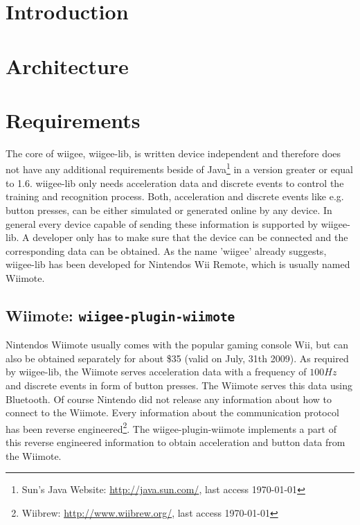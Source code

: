 \documentclass[%
   11pt,              %
   english,           %
   a4paper,           %
   DIV11,             %
   BCOR12mm,		  %
   titlepage,		  %
   bibtotoc,		  %
   liststotoc,		  %
   final,			  %
   twoside,			  %
   openright,		  %
   cleardoubleempty   %
]{scrreprt}%
\begin{document}
\begin{titlepage}
 
\end{titlepage}

\tableofcontents

\chapter{Introduction}

\chapter{Architecture}


\chapter{Requirements}
The core of wiigee, wiigee-lib, is written device independent and therefore does not have any additional requirements beside of Java\footnote{Sun's Java Website: \url{http://java.sun.com/}, last access \today} in a version greater or equal to 1.6. wiigee-lib only needs acceleration data and discrete events to control the training and recognition process. Both, acceleration and discrete events like e.g. button presses, can be either simulated or generated online by any device. In general every device capable of sending these information is supported by wiigee-lib. A developer only has to make sure that the device can be connected and the corresponding data can be obtained. As the name 'wiigee' already suggests, wiigee-lib has been developed for Nintendos Wii Remote, which is usually named Wiimote.

\section{Wiimote: \texttt{wiigee-plugin-wiimote}}
Nintendos Wiimote usually comes with the popular gaming console Wii, but can also be obtained separately for about \$35 (valid on July, 31th 2009). As required by wiigee-lib, the Wiimote serves acceleration data with a frequency of $100Hz$ and discrete events in form of button presses. The Wiimote serves this data using Bluetooth. Of course Nintendo did not release any information about how to connect to the Wiimote. Every information about the communication protocol has been reverse engineered\footnote{Wiibrew: \url{http://www.wiibrew.org/}, last access \today}. The wiigee-plugin-wiimote implements a part of this reverse engineered information to obtain acceleration and button data from the Wiimote.
\end{document}
